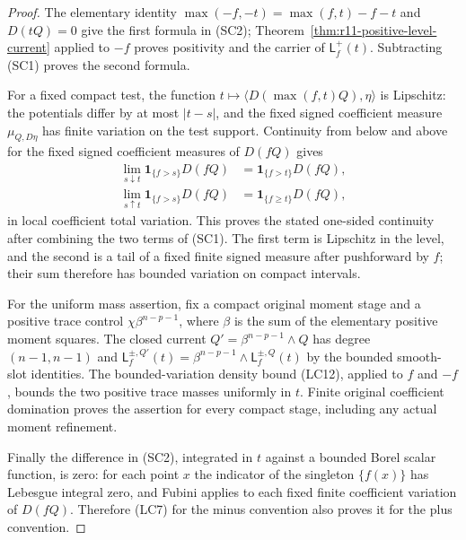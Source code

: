 \begin{proof}
The elementary identity
$\max(-f,-t)=\max(f,t)-f-t$ and $D(tQ)=0$ give the first
formula in (SC2); Theorem~\ref{thm:r11-positive-level-current}
applied to $-f$ proves positivity and the carrier of
$\mathsf L_f^{+}(t)$.  Subtracting (SC1) proves the second formula.

For a fixed compact test, the function
$t\mapsto\langle D(\max(f,t)Q),\eta\rangle$ is Lipschitz:
the potentials differ by at most $|t-s|$, and the fixed signed
coefficient measure $\mu_{Q,D\eta}$ has finite variation on the
test support.  Continuity from below and above for the fixed
signed coefficient measures of $D(fQ)$ gives
\[
 \begin{split}
 \lim_{s\downarrow t}\mathbf1_{\{f>s\}}D(fQ)
       &=\mathbf1_{\{f>t\}}D(fQ),\\
 \lim_{s\uparrow t}\mathbf1_{\{f>s\}}D(fQ)
       &=\mathbf1_{\{f\geq t\}}D(fQ),
 \end{split}
\]
in local coefficient total variation.  This proves the stated
one-sided continuity after combining the two terms of (SC1).
The first term is Lipschitz in the level, and the second is a
tail of a fixed finite signed measure after pushforward by $f$;
their sum therefore has bounded variation on compact intervals.

For the uniform mass assertion, fix a compact original moment
stage and a positive trace control $\chi\beta^{n-p-1}$, where
$\beta$ is the sum of the elementary positive moment squares.
The closed current $Q'=\beta^{n-p-1}\wedge Q$ has degree
$(n-1,n-1)$ and
$\mathsf L_f^{\pm,Q'}(t)=\beta^{n-p-1}\wedge
\mathsf L_f^{\pm,Q}(t)$ by the bounded smooth-slot identities.
The bounded-variation density bound (LC12), applied to $f$ and
$-f$, bounds the two positive trace masses uniformly in $t$.
Finite original coefficient domination proves the assertion for
every compact stage, including any actual moment refinement.

Finally the difference in (SC2), integrated in $t$ against a
bounded Borel scalar function, is zero: for each point $x$ the
indicator of the singleton $\{f(x)\}$ has Lebesgue integral
zero, and Fubini applies to each fixed finite coefficient
variation of $D(fQ)$.  Therefore (LC7) for the minus convention
also proves it for the plus convention.
\end{proof}

